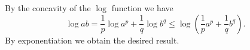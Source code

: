 \documentclass[12pt]{article}
\begin{document}
By the concavity of the $\log$ function we have
\[
  \log ab = \frac 1 p \log a^p + \frac 1 q \log b^q \le \log(\frac 1 p a^p + \frac 1 q b^q).
\]
By exponentiation we obtain the desired result.
\end{document}
